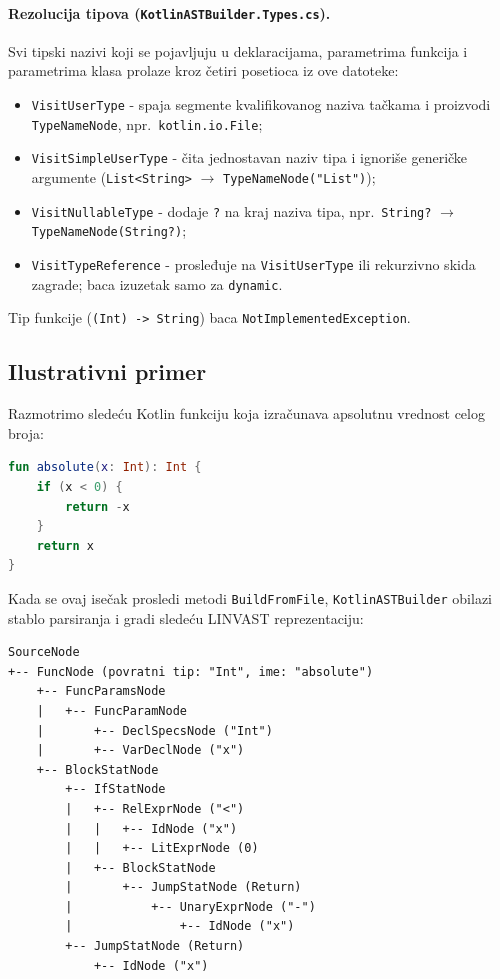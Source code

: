 \documentclass[a4paper]{article}
\begin{document}
\paragraph{Rezolucija tipova (\texttt{KotlinASTBuilder.Types.cs}).}
Svi tipski nazivi koji se pojavljuju u deklaracijama, parametrima funkcija i
parametrima klasa prolaze kroz četiri posetioca iz ove datoteke:

\begin{itemize}
    \item \texttt{VisitUserType} - spaja segmente kvalifikovanog naziva tačkama
          i proizvodi \texttt{TypeNameNode}, npr.\ \texttt{kotlin.io.File};
    \item \texttt{VisitSimpleUserType} - čita jednostavan naziv tipa i ignoriše
          generičke argumente (\texttt{List<String>} $\to$ \texttt{TypeNameNode("List")});
    \item \texttt{VisitNullableType} - dodaje \texttt{?} na kraj naziva tipa,
          npr.\ \texttt{String?} $\to$ \texttt{TypeNameNode(String?)};
    \item \texttt{VisitTypeReference} - prosleđuje na \texttt{VisitUserType} ili
          rekurzivno skida zagrade; baca izuzetak samo za \texttt{dynamic}.
\end{itemize}

\noindent
Tip funkcije (\texttt{(Int) -> String}) baca \texttt{NotImplementedException}.

\newpage
\subsection{Ilustrativni primer}

Razmotrimo sledeću Kotlin funkciju koja izračunava apsolutnu vrednost celog broja:

\begin{lstlisting}[language=Kotlin, caption={Primer Kotlin funkcije -- apsolutna vrednost}]
fun absolute(x: Int): Int {
    if (x < 0) {
        return -x
    }
    return x
}
\end{lstlisting}

Kada se ovaj isečak prosledi metodi \texttt{BuildFromFile}, \texttt{KotlinASTBuilder}
obilazi stablo parsiranja i gradi sledeću LINVAST reprezentaciju:

\begin{verbatim}
SourceNode
+-- FuncNode (povratni tip: "Int", ime: "absolute")
    +-- FuncParamsNode
    |   +-- FuncParamNode
    |       +-- DeclSpecsNode ("Int")
    |       +-- VarDeclNode ("x")
    +-- BlockStatNode
        +-- IfStatNode
        |   +-- RelExprNode ("<")
        |   |   +-- IdNode ("x")
        |   |   +-- LitExprNode (0)
        |   +-- BlockStatNode
        |       +-- JumpStatNode (Return)
        |           +-- UnaryExprNode ("-")
        |               +-- IdNode ("x")
        +-- JumpStatNode (Return)
            +-- IdNode ("x")
\end{verbatim}
\end{document}
